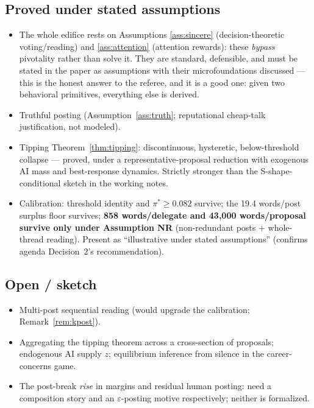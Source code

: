 \documentclass[11pt]{article}
\theoremstyle{remark}
\begin{document}
\subsection*{Proved under stated assumptions}
\begin{itemize}[itemsep=1pt]
\item The whole edifice rests on Assumptions \ref{ass:sincere} (decision-theoretic
voting/reading) and \ref{ass:attention} (attention rewards): these \emph{bypass}
pivotality rather than solve it. They are standard, defensible, and must be
stated in the paper as assumptions with their microfoundations discussed ---
this is the honest answer to the referee, and it is a good one: given two
behavioral primitives, everything else is derived.
\item Truthful posting (Assumption~\ref{ass:truth}; reputational cheap-talk
justification, not modeled).
\item Tipping Theorem~\ref{thm:tipping}: discontinuous, hysteretic,
below-threshold collapse --- proved, under a representative-proposal reduction
with exogenous AI mass and best-response dynamics. Strictly stronger than the
S-shape-conditional sketch in the working notes.
\item Calibration: threshold identity and $\pi^*\ge0.082$ survive; the 19.4
words/post surplus floor survives; \textbf{858 words/delegate and 43{,}000
words/proposal survive only under Assumption NR} (non-redundant posts +
whole-thread reading). Present as ``illustrative under stated assumptions''
(confirms agenda Decision~2's recommendation).
\end{itemize}

\subsection*{Open / sketch}
\begin{itemize}[itemsep=1pt]
\item Multi-post sequential reading (would upgrade the calibration; Remark~\ref{rem:kpost}).
\item Aggregating the tipping theorem across a cross-section of proposals;
endogenous AI supply $z$; equilibrium inference from silence in the
career-concerns game.
\item The post-break \emph{rise} in margins and residual human posting: need a
composition story and an $\varepsilon$-posting motive respectively; neither is
formalized.
\end{itemize}
\end{document}
